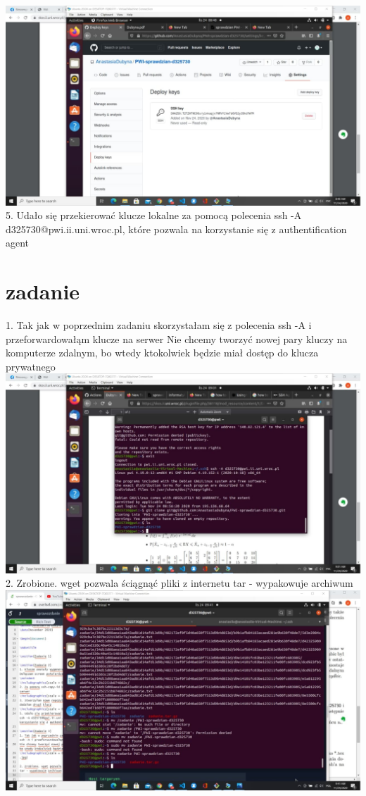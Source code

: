 \documentclass{article}
\begin{document}
\includegraphics[scale = 0.5]{photo_2020-11-24_09-24-24.jpg}\\
5. Udało się przekierować klucze lokalne za pomocą polecenia ssh -A d325730@pwi.ii.uni.wroc.pl, które pozwala na korzystanie się z authentification agent\\

\section{zadanie}
1. Tak jak w poprzednim zadaniu skorzystałam się z polecenia ssh -A i przeforwardowałąm klucze na serwer
Nie chcemy tworzyć nowej pary kluczy na komputerze zdalnym, bo wtedy ktokolwiek będzie miał dostęp do klucza prywatnego\\
\includegraphics[scale = 0.5]{photo_2020-11-24_09-24-27.jpg}\\

2. Zrobione. wget pozwala ściągnąć pliki z internetu 
tar - wypakowuje archiwum \\
\includegraphics[scale = 0.5]{photo_2020-11-24_09-41-34.jpg}\\
\end{document}
